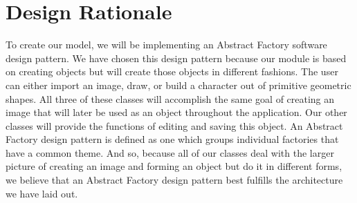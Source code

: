 \documentclass[a4paper, 11pt]{article} %
\begin{document}

\section*{Design Rationale}

To create our model, we will be implementing an Abstract Factory software design pattern. We have chosen this design pattern because our module is based on creating objects but will create those objects in different fashions. The user can either import an image, draw, or build a character out of primitive geometric shapes. All three of these classes will accomplish the same goal of creating an image that will later be used as an object throughout the application. Our other classes will provide the functions of editing and saving this object. An Abstract Factory design pattern is defined as one which groups individual factories that have a common theme. And so, because all of our classes deal with the larger picture of creating an image and forming an object but do it in different forms, we believe that an Abstract Factory design pattern best fulfills the architecture we have laid out.

\end{document}
